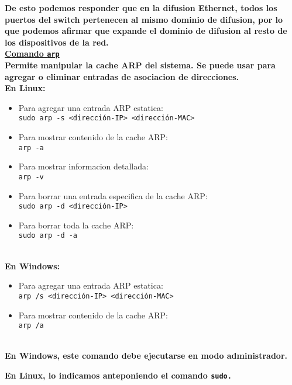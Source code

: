 \documentclass{article}
\begin{document}
\textbf{De esto podemos responder que en la difusion Ethernet, todos los puertos del switch pertenecen al mismo dominio de difusion, por lo que podemos afirmar que expande el dominio de difusion al resto de los dispositivos de la red.} \\

\underline{\textbf{Comando \texttt{arp}}} \\

\textbf{Permite manipular la cache ARP del sistema. Se puede usar para agregar o eliminar entradas de asociacion de direcciones.} \\

\textbf{En Linux:} \\
\begin{itemize}
    \item Para agregar una entrada ARP estatica: \\ \texttt{sudo arp -s <dirección-IP> <dirección-MAC>}
    \item Para mostrar contenido de la cache ARP: \\
    \texttt{arp -a}
    \item Para mostrar informacion detallada: \\
    \texttt{arp -v}
    \item Para borrar una entrada especifica de la cache ARP: \\
    \texttt{sudo arp -d <dirección-IP>}
    \item Para borrar toda la cache ARP: \\
    \texttt{sudo arp -d -a}    
\end{itemize}
\textbf{} \\

\textbf{En Windows:} \\
\begin{itemize}
    \item Para agregar una entrada ARP estatica: \\
    \texttt{arp /s <dirección-IP> <dirección-MAC>}
    \item Para mostrar contenido de la cache ARP: \\
    \texttt{arp /a}
\end{itemize}
\textbf{} \\

\textbf{En Windows, este comando debe ejecutarse en modo administrador.}

\textbf{En Linux, lo indicamos anteponiendo el comando \texttt{sudo.}} \\\\
\end{document}
